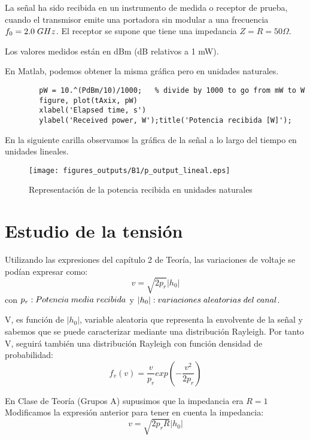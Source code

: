 \documentclass{article}
\begin{document}
    \par La señal ha sido recibida en un instrumento de medida o receptor de prueba, cuando el transmisor emite una portadora sin modular a una frecuencia \(f_0=2.0  \hspace{0.1cm}GHz \). El receptor se supone que tiene una impedancia \( Z=R=50\Omega\).
    \par Los valores medidos están en dBm (dB relativos a 1 mW).
    \par En Matlab, podemos obtener la misma gráfica pero en unidades naturales.
    \begin{lstlisting}
        pW = 10.^(PdBm/10)/1000;   % divide by 1000 to go from mW to W
        figure, plot(tAxix, pW)
        xlabel('Elapsed time, s')
        ylabel('Received power, W');title('Potencia recibida [W]');
    \end{lstlisting}
    \par En la siguiente carilla observamos la gráfica de la señal a lo largo del tiempo en unidades lineales.
    \clearpage
    \begin{figure}[h]
        \centering
        \texttt{[image: figures\_outputs/B1/p\_output\_lineal.eps]}
        \caption{Representación de la potencia recibida en unidades naturales}
        \label{fig:received_power_unidades_naturales}
    \end{figure}
\section{Estudio de la tensión}
    \par Utilizando las expresiones del capítulo 2 de Teoría, las variaciones de voltaje se podían expresar como:
    \begin{equation}
        \tag{amplitud de la señal RF}
        v = \sqrt{2p_r}|h_0|
        \label{eq:voltaje_entrada}
    \end{equation}
    con \(p_r : Potencia \hspace{0.1cm}media\hspace{0.1cm} recibida\) y \( |h_0| : variaciones\hspace{0.1cm} aleatorias \hspace{0.1cm}del \hspace{0.1cm}canal\).
    \par V, es función de \(|h_0|\), variable aleatoria que representa la envolvente de la señal y sabemos que se puede caracterizar mediante una distribución Rayleigh. Por tanto V, seguirá también una distribución Rayleigh con función densidad de probabilidad: 
    \begin{equation}
    \tag{función densidad de probabilidad}
        f_v(v) = \frac{v}{p_r}exp\left({-\frac{v^2}{2p_r}}\right)
        \label{eq:fdp}
    \end{equation}
    \par En Clase de Teoría (Grupos A) supusimos que la impedancia era \(R=1 \) Modificamos la expresión anterior para tener en cuenta la impedancia:
    \begin{equation}
    \tag{voltaje a la entrada del receptor}
        v = \sqrt{2p_rR}|h_0|
        \label{eq:voltaje_entrada_R}
    \end{equation}
\end{document}
